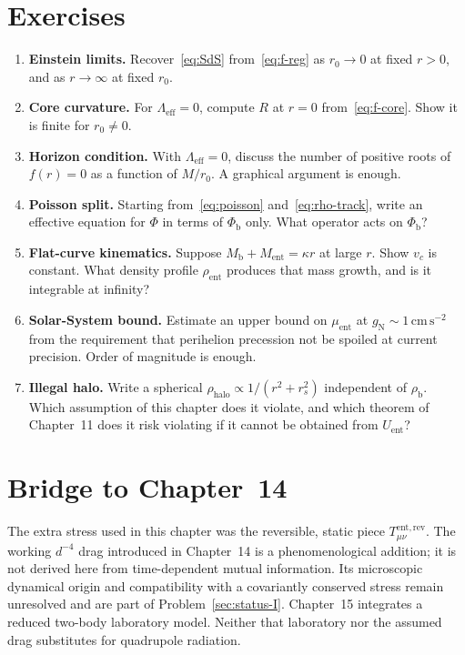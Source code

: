 \section{Exercises}
\label{sec:ch13-exercises}

\begin{enumerate}
  \item \textbf{Einstein limits.}
    Recover~\eqref{eq:SdS} from~\eqref{eq:f-reg} as \(r_0\to 0\)
    at fixed \(r>0\), and as \(r\to\infty\) at fixed \(r_0\).
  \item \textbf{Core curvature.}
    For \(\Lambda_{\mathrm{eff}}=0\), compute \(R\) at \(r=0\)
    from~\eqref{eq:f-core}. Show it is finite for \(r_0\neq 0\).
  \item \textbf{Horizon condition.}
    With \(\Lambda_{\mathrm{eff}}=0\), discuss the number of
    positive roots of \(f(r)=0\) as a function of \(M/r_0\).
    A graphical argument is enough.
  \item \textbf{Poisson split.}
    Starting from~\eqref{eq:poisson} and~\eqref{eq:rho-track},
    write an effective equation for \(\Phi\) in terms of
    \(\Phi_{\mathrm{b}}\) only. What operator acts on
    \(\Phi_{\mathrm{b}}\)?
  \item \textbf{Flat-curve kinematics.}
    Suppose \(M_{\mathrm{b}}+M_{\mathrm{ent}}=\kappa r\) at large
    \(r\). Show \(v_c\) is constant. What density profile
    \(\rho_{\mathrm{ent}}\) produces that mass growth, and is it
    integrable at infinity?
  \item \textbf{Solar-System bound.}
    Estimate an upper bound on \(\mu_{\mathrm{ent}}\) at
    \(g_{\mathrm{N}}\sim 1\,\mathrm{cm\,s^{-2}}\) from the
    requirement that perihelion precession not be spoiled at
    current precision. Order of magnitude is enough.
  \item \textbf{Illegal halo.}
    Write a spherical \(\rho_{\mathrm{halo}}\propto 1/(r^2+r_s^2)\)
    independent of \(\rho_{\mathrm{b}}\). Which assumption of
    this chapter does it violate, and which theorem of
    Chapter~11 does it risk violating if it cannot be obtained
    from \(U_{\mathrm{ent}}\)?
\end{enumerate}

\section{Bridge to Chapter~14}
\label{sec:ch13-bridge}

The extra stress used in this chapter was the reversible,
static piece \(T_{\mu\nu}^{\mathrm{ent,rev}}\). The working
\(d^{-4}\) drag introduced in Chapter~14 is a phenomenological
addition; it is not derived here from time-dependent mutual
information. Its microscopic dynamical origin and compatibility
with a covariantly conserved stress remain unresolved and are
part of Problem~\ref{sec:status-I}. Chapter~15 integrates a
reduced two-body laboratory model. Neither that laboratory nor
the assumed drag substitutes for quadrupole radiation.